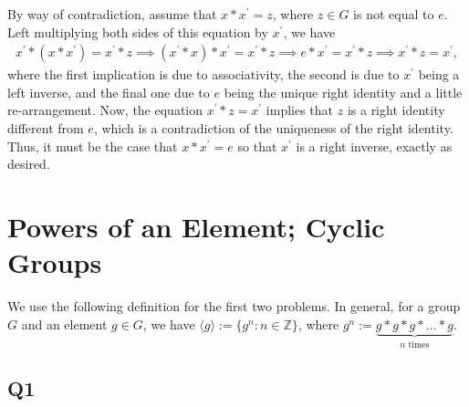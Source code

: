 \documentclass[12pt]{article}
\def\Z{{\mathbb Z}}        %
\numberwithin{theorem}{section}
\numberwithin{equation}{section}
\numberwithin{remark}{section}
\numberwithin{definition}{section}
\numberwithin{theorem}{section}
\numberwithin{lemma}{section}
\numberwithin{example}{section}
\begin{document}
By way of contradiction, assume that $x*x^\prime = z$, where $z\in G$ is not equal to $e$. Left multiplying both sides of this equation by $x^\prime$, we have
\begin{align*}
	x^\prime*(x*x^\prime) = x^\prime*z \implies (x^\prime*x)*x^\prime = x^\prime*z \implies e*x^\prime = x^\prime* z \implies x^\prime * z = x^\prime,
\end{align*}
where the first implication is due to associativity, the second is due to $x^\prime$ being a left inverse, and the final one due to $e$ being the unique right identity and a little re-arrangement. Now, the equation $x^\prime * z = x^\prime$ implies that $z$ is a right identity different from $e$, which is a contradiction of the uniqueness of the right identity. Thus, it must be the case that $x*x^\prime = e$ so that $x^\prime$ is a right inverse, exactly as desired. 




\newpage

\section{Powers of an Element; Cyclic Groups}

We use the following definition for the first two problems. In general, for a group $G$ and an element $g\in G$, we have $\langle g \rangle:=\{g^n:n\in\Z\}$, where $g^n:=\underbrace{g*g*g*\ldots*g}_{n\text{ times}}$.

\subsection{Q1}
\end{document}
